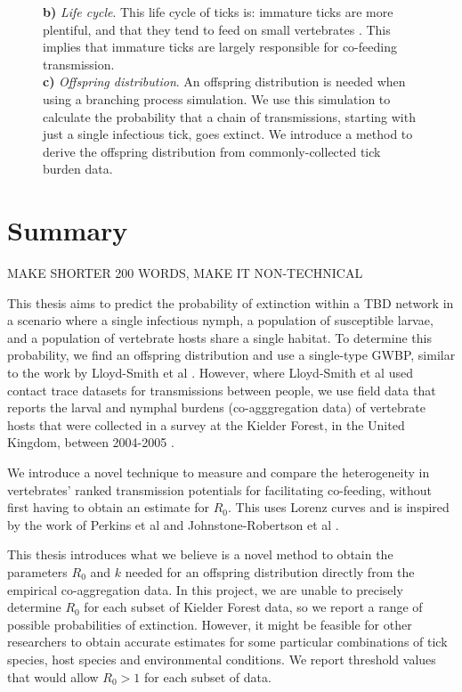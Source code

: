 \documentclass{article}
\begin{document}
\begin{figure}[h!]
\begin{mdframed}[backgroundcolor=grey250,rightline=false,leftline=false,topline=false]
{	    \textbf{b)} \textit{Life cycle}. This life cycle of ticks is: immature ticks are more plentiful, and that they tend to feed on small vertebrates \cite{Randolph1998}. This implies that immature ticks are largely responsible for co-feeding transmission. \\
	    \textbf{c)} \textit{Offspring distribution}. An offspring distribution is needed when using a branching process simulation. We use this simulation to calculate the probability that a chain of transmissions, starting with just a single infectious tick, goes extinct. We introduce a method to derive the offspring distribution from commonly-collected tick burden data.}
	    \label{fig:graphical_abstract}
	\end{mdframed}
\end{figure}

\thispagestyle{empty}
\addtocounter{page}{-1}

\newpage

\section*{Summary}

MAKE SHORTER 200 WORDS, MAKE IT NON-TECHNICAL

This thesis aims to predict the probability of extinction within a TBD network in a scenario where a single infectious nymph, a population of susceptible larvae, and a population of vertebrate hosts share a single habitat. To determine this probability, we find an offspring distribution and use a single-type GWBP, similar to the work by Lloyd-Smith et al \cite{LloydSmith2005}. However, where Lloyd-Smith et al used contact trace datasets for transmissions between people, we use field data that reports the larval and nymphal burdens (co-agggregation data) of vertebrate hosts that were collected in a survey at the Kielder Forest, in the United Kingdom, between 2004-2005 \cite{Bown2008, Bown2011}.

We introduce a novel technique to measure and compare the heterogeneity in vertebrates' ranked transmission potentials for facilitating co-feeding, without first having to obtain an estimate for $ R_0 $. This uses Lorenz curves and is inspired by the work of Perkins et al \cite{Perkins_2003} and Johnstone-Robertson et al \cite{JohnstoneRobertson2020}.

This thesis introduces what we believe is a novel method to obtain the parameters $ R_0 $ and $ k $ needed for an offspring distribution directly from the empirical co-aggregation data. In this project, we are unable to precisely determine $ R_0 $ for each subset of Kielder Forest data, so we report a range of possible probabilities of extinction. However, it might be feasible for other researchers to obtain accurate estimates for some particular combinations of tick species, host species and environmental conditions. We report threshold values that would allow $ R_0 > 1 $ for each subset of data.
\end{document}
